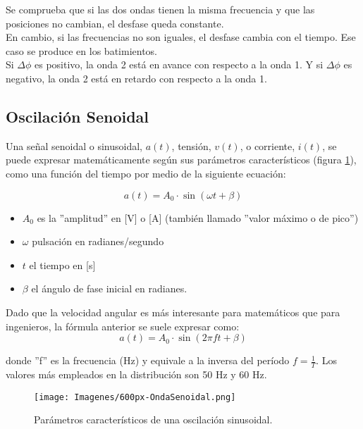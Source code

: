 \documentclass{article}
\begin{document}
Se comprueba que si las dos ondas tienen la misma frecuencia y que las posiciones no cambian, el desfase queda constante.\citep{Defase}\\

En cambio, si las frecuencias no son iguales, el desfase cambia con el tiempo. Ese caso se produce en los batimientos.\citep{Defase}\\

Si $\Delta \phi$  es positivo, la onda 2 está en avance con respecto a la onda 1. Y si $\Delta \phi$  es negativo, la onda 2 está en retardo con respecto a la onda 1.

\subsection{Oscilación Senoidal}

Una señal senoidal o sinusoidal, $a(t)$, tensión, $v(t)$, o corriente, $i(t)$, se puede expresar matemáticamente según sus parámetros característicos (figura \ref{fig:ondaSenoidal}), como una función del tiempo por medio de la siguiente ecuación:\citep{CA}

\begin{equation}
    a(t)=A_0 \cdot \sin(\omega t + \beta)
\end{equation}
\begin{itemize}
    \item $A_0$ es la ''amplitud'' en [V] o [A] (también llamado ''valor máximo o de pico'')
    
    \item $\omega$  pulsación en radianes/segundo
    
    \item $t$ el tiempo en [s]
    
    \item $\beta$ el ángulo de fase inicial en radianes.
\end{itemize}


Dado que la velocidad angular es más interesante para matemáticos que para ingenieros, la fórmula anterior se suele expresar como:\citep{CA}\\

\begin{equation}
    a(t)=A_0 \cdot \sin(2 \pi f t + \beta)
\end{equation}


donde ''f'' es la frecuencia (Hz) y equivale a la inversa del período $f=\frac{1}{T}$. Los valores más empleados en la distribución son 50 Hz y 60 Hz.\citep{CA}


\begin{figure}[ht!]
    \centering
    \texttt{[image: Imagenes/600px-OndaSenoidal.png]}
    \caption{Parámetros característicos de una oscilación sinusoidal.}
    \label{fig:ondaSenoidal}
\end{figure}




\end{document}
